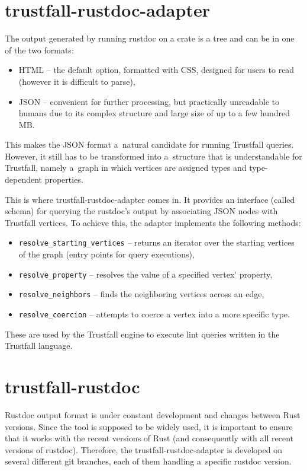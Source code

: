 \documentclass[licencjacka,en]{pracamgr}
\begin{document}
\section{trustfall-rustdoc-adapter}\label{r:section_trustfall_rustdoc_adapter}
The output generated by running rustdoc on a crate is a tree and can be in one of the two formats:
\begin{itemize}
	\item HTML -- the default option, formatted with CSS, designed for users to read (however it is
		difficult to parse),
	\item JSON -- convenient for further processing, but practically unreadable to humans due to its
		complex structure and large size of up to a few hundred MB.
\end{itemize}
This makes the JSON format a~natural candidate for running Trustfall queries. However, it still has
to be transformed into a~structure that is understandable for Trustfall, namely a~graph in which
vertices are assigned types and type-dependent properties.

This is where trustfall-rustdoc-adapter comes in. It provides an interface (called schema) for querying
the rustdoc's output by associating JSON nodes with Trustfall vertices. To achieve this, the adapter
implements the following methods:
\begin{itemize}
	\item \texttt{resolve\_starting\_vertices} -- returns an iterator over the starting vertices of
		the graph (entry points for query executions),
	\item \texttt{resolve\_property} -- resolves the value of a specified vertex' property,
	\item \texttt{resolve\_neighbors} -- finds the neighboring vertices across an edge,
	\item \texttt{resolve\_coercion} -- attempts to coerce a vertex into a more specific type.
\end{itemize}
These are used by the Trustfall engine to execute lint queries written in the Trustfall language.

\section{trustfall-rustdoc}\label{r:section_trustfall_rustdoc}

Rustdoc output format is under constant development and changes between Rust versions.
Since the tool is supposed to be widely used, it is important to ensure that it works with
the recent versions of Rust (and consequently with all recent versions of rustdoc).
Therefore, the trustfall-rustdoc-adapter is developed on several different git branches,
each of them handling a~specific rustdoc version.
\end{document}
